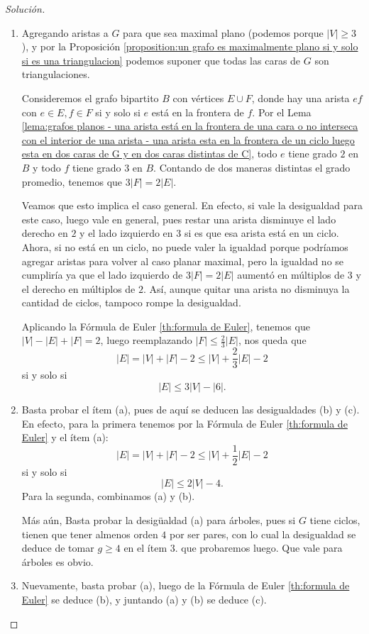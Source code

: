 \documentclass[12pt]{report}
\theoremstyle{plain}
\theoremstyle{definition}
\newenvironment{solution}{\begin{proof}[Solución]}{\end{proof}}
\newcommand{\abs}[1]{\left \vert #1 \right \vert}
\begin{document}
\begin{solution}
\begin{enumerate}
\item Agregando aristas a $G$ para que sea maximal plano (podemos porque $\abs V \geq 3$), y por la Proposición \ref{proposition:un grafo es maximalmente plano si y solo si es una triangulacion} podemos suponer que todas las caras de $G$ son triangulaciones.

Consideremos el grafo bipartito $B$ con vértices $E \cup F$, donde hay una arista $ef$ con $e \in E, f \in F$ si y solo si $e$ está en la frontera de $f$. Por el Lema \ref{lema:grafos planos - una arista está en la frontera de una cara o no interseca con el interior de una arista - una arista esta en la frontera de un ciclo luego esta en dos caras de G y en dos caras distintas de C}, todo $e$ tiene grado $2$ en $B$ y todo $f$ tiene grado $3$ en $B$. Contando de dos maneras distintas el grado promedio, tenemos que $3 \abs F = 2 \abs E$.

 Veamos que esto implica el caso general. En efecto, si vale la desigualdad para este caso, luego vale en general, pues restar una arista disminuye el lado derecho en $2$ y el lado izquierdo en $3$ si es que esa arista está en un ciclo. Ahora, si no está en un ciclo, no puede valer la igualdad porque podríamos agregar aristas para volver al caso planar maximal, pero la igualdad no se cumpliría ya que el lado izquierdo de $3 \abs F = 2 \abs E$ aumentó en múltiplos de $3$ y el derecho en múltiplos de $2$. Así, aunque quitar una arista no disminuya la cantidad de ciclos, tampoco rompe la desigualdad.

 \bigskip

 Aplicando la Fórmula de Euler \ref{th:formula de Euler}, tenemos que $\abs V - \abs E + \abs F = 2$, luego reemplazando $\abs F \leq \frac 2 3 \abs E$, nos queda que
 \[
     \abs E = \abs V + \abs F - 2 \leq \abs V + \frac 2 3 \abs E - 2
 \]
 si y solo si
 \[
     \abs E \leq 3 \abs V - \abs 6.
 \]
 \item Basta probar el ítem (a), pues de aquí se deducen las desigualdades (b) y (c). En efecto, para la primera tenemos por la Fórmula de Euler \ref{th:formula de Euler} y el ítem (a):
 \[
     \abs E = \abs V + \abs F - 2 \leq \abs V + \frac 1 2 \abs E - 2
 \]
 si y solo si
 \[
     \abs E \leq 2 \abs V - 4.
 \]
 Para la segunda, combinamos (a) y (b).

 Más aún, Basta probar la desigüaldad (a) para árboles, pues si $G$ tiene ciclos, tienen que tener almenos orden $4$ por ser pares, con lo cual la desigualdad se deduce de tomar $g \geq 4$ en el ítem 3. que probaremos luego. Que vale para árboles es obvio.
 \item Nuevamente, basta probar (a), luego de la Fórmula de Euler \ref{th:formula de Euler} se deduce (b), y juntando (a) y (b) se deduce (c).


\end{enumerate}
\end{solution}
\end{document}
